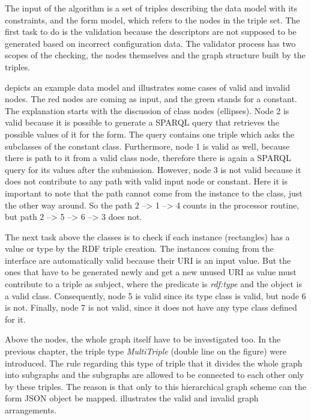 The input of the algorithm is a set of triples describing the data model with its constraints, and the form model, which refers to the nodes in the triple set. The first task to do is the validation because the descriptors are not supposed to be generated based on incorrect configuration data. The validator process has two scopes of the checking, the nodes themselves and the graph structure built by the triples.
 
 depicts an example data model and illustrates some cases of valid and invalid nodes. The red nodes are coming as input, and the green stands for a constant. The explanation starts with the discussion of class nodes (ellipses). Node 2 is valid because it is possible to generate a SPARQL query that retrieves the possible values of it for the form. The query contains one triple which asks the subclasses of the constant class. Furthermore, node 1 is valid as well, because there is path to it from a valid class node, therefore there is again a SPARQL query for its values after the submission. However, node 3 is not valid because it does not contribute to any path with valid input node or constant. Here it is important to note that the path cannot come from the instance to the class, just the other way around. So the path 2 --> 1 --> 4 counts in the processor routine, but path 2 --> 5 --> 6 --> 3 does not.


The next task above the classes is to check if each instance (rectangles) has a value or type by the RDF triple creation. The instances coming from the interface are automatically valid because their URI is an input value. But the ones that have to be generated newly and get a new unused URI as value must contribute to a triple as subject, where the predicate is \textit{rdf:type} and the object is a valid class. Consequently, node 5 is valid since its type class is valid, but node 6 is not. Finally, node 7 is not valid, since it does not have any type class defined for it.


Above the nodes, the whole graph itself have to be investigated too. In the previous chapter, the triple type \textit{MultiTriple} (double line on the figure) were introduced. The rule regarding this type of triple that it divides the whole graph into subgraphs and the subgraphs are allowed to be connected to each other only by these triples. The reason is that only to this hierarchical graph scheme can the form JSON object be mapped.   illustrates the valid and invalid graph arrangements.

